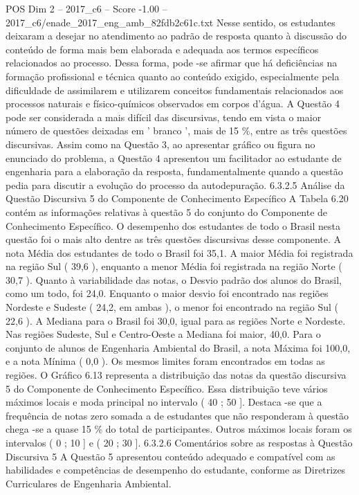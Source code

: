 \begin{textsample}{POS Dim 2 – 2017\_c6 – Score -1.00 – 2017\_c6/enade\_2017\_eng\_amb\_82fdb2c61c.txt}
Nesse sentido, os estudantes deixaram a desejar no atendimento ao padrão de resposta quanto à discussão do conteúdo de forma mais bem elaborada e adequada aos termos específicos relacionados ao processo.
Dessa forma, pode -se afirmar que há deficiências na formação profissional e técnica quanto ao conteúdo exigido, especialmente pela dificuldade de assimilarem e utilizarem conceitos fundamentais relacionados aos processos naturais e físico-químicos observados em corpos d'água.
A Questão 4 pode ser considerada a mais difícil das discursivas, tendo em vista o maior número de questões deixadas em ' branco ', mais de 15 \%, entre as três questões discursivas.
Assim como na Questão 3, ao apresentar gráfico ou figura no enunciado do problema, a Questão 4 apresentou um facilitador ao estudante de engenharia para a elaboração da resposta, fundamentalmente quando a questão pedia para discutir a evolução do processo da autodepuração. 6.3.2.5 Análise da Questão Discursiva 5 do Componente de Conhecimento Específico A Tabela 6.20 contém as informações relativas à questão 5 do conjunto do Componente de Conhecimento Específico.
O desempenho dos estudantes de todo o Brasil nesta questão foi o mais alto dentre as três questões discursivas desse componente.
A nota Média dos estudantes de todo o Brasil foi 35,1.
A maior Média foi registrada na região Sul ( 39,6 ), enquanto a menor Média foi registrada na região Norte ( 30,7 ).
Quanto à variabilidade das notas, o Desvio padrão dos alunos do Brasil, como um todo, foi 24,0.
Enquanto o maior desvio foi encontrado nas regiões Nordeste e Sudeste ( 24,2, em ambas ), o menor foi encontrado na região Sul ( 22,6 ).
A Mediana para o Brasil foi 30,0, igual para as regiões Norte e Nordeste.
Nas regiões Sudeste, Sul e Centro-Oeste a Mediana foi maior, 40,0.
Para o conjunto de alunos de Engenharia Ambiental do Brasil, a nota Máxima foi 100,0, e a nota Mínima ( 0,0 ).
Os mesmos limites foram encontrados em todas as regiões.
O Gráfico 6.13 representa a distribuição das notas da questão discursiva 5 do Componente de Conhecimento Específico.
Essa distribuição teve vários máximos locais e moda principal no intervalo ( 40 ; 50 ].
Destaca -se que a frequência de notas zero somada a de estudantes que não responderam à questão chega -se a quase 15 \% do total de participantes.
Outros máximos locais foram os intervalos ( 0 ; 10 ] e ( 20 ; 30 ]. 6.3.2.6 Comentários sobre as respostas à Questão Discursiva 5 A Questão 5 apresentou conteúdo adequado e compatível com as habilidades e competências de desempenho do estudante, conforme as Diretrizes Curriculares de Engenharia Ambiental.

\end{textsample}
